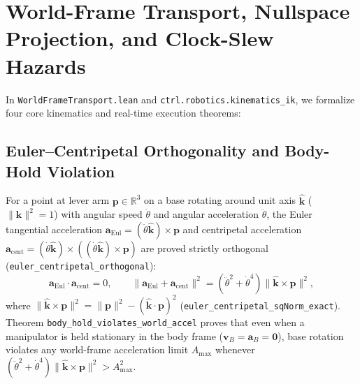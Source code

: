 \documentclass[10pt,twocolumn]{article}
\theoremstyle{definition}
\begin{document}
\section{World-Frame Transport, Nullspace Projection, and Clock-Slew Hazards}

In \texttt{WorldFrameTransport.lean} and \texttt{ctrl.robotics.kinematics\_ik}, we formalize four core kinematics and real-time execution theorems:

\subsection{Euler--Centripetal Orthogonality and Body-Hold Violation}
For a point at lever arm $\mathbf{p} \in \mathbb{R}^3$ on a base rotating around unit axis $\hat{\mathbf{k}}$ ($\|\hat{\mathbf{k}}\|^2 = 1$) with angular speed $\dot{\theta}$ and angular acceleration $\ddot{\theta}$, the Euler tangential acceleration $\mathbf{a}_{\text{Eul}} = (\ddot{\theta}\hat{\mathbf{k}})\times\mathbf{p}$ and centripetal acceleration $\mathbf{a}_{\text{cent}} = (\dot{\theta}\hat{\mathbf{k}})\times((\dot{\theta}\hat{\mathbf{k}})\times\mathbf{p})$ are proved strictly orthogonal (\texttt{euler\_centripetal\_orthogonal}):
\begin{equation}
  \mathbf{a}_{\text{Eul}} \cdot \mathbf{a}_{\text{cent}} = 0, \qquad
  \|\mathbf{a}_{\text{Eul}} + \mathbf{a}_{\text{cent}}\|^2 = (\ddot{\theta}^2 + \dot{\theta}^4)\|\hat{\mathbf{k}}\times\mathbf{p}\|^2,
\end{equation}
where $\|\hat{\mathbf{k}}\times\mathbf{p}\|^2 = \|\mathbf{p}\|^2 - (\hat{\mathbf{k}}\cdot\mathbf{p})^2$ (\texttt{euler\_centripetal\_sqNorm\_exact}). Theorem \texttt{body\_hold\_violates\_world\_accel} proves that even when a manipulator is held stationary in the body frame ($\mathbf{v}_B = \mathbf{a}_B = \mathbf{0}$), base rotation violates any world-frame acceleration limit $A_{\max}$ whenever $(\ddot{\theta}^2 + \dot{\theta}^4)\|\hat{\mathbf{k}}\times\mathbf{p}\|^2 > A_{\max}^2$.
\end{document}
